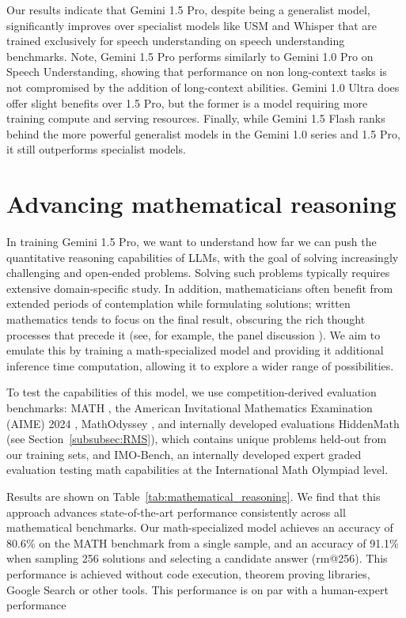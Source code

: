 Our results indicate that Gemini 1.5 Pro, despite being a generalist model, significantly improves over specialist models like USM and Whisper that are trained exclusively for speech understanding on speech understanding benchmarks. Note, Gemini 1.5 Pro performs similarly to Gemini 1.0 Pro on Speech Understanding, showing that performance on non long-context tasks is not compromised by the addition of long-context abilities. Gemini 1.0 Ultra does offer slight benefits over 1.5 Pro, but the former is a model requiring more training compute and serving resources. Finally, while Gemini 1.5 Flash ranks behind the more powerful generalist models in the Gemini 1.0 series and 1.5 Pro, it still outperforms specialist models.

\begin{scriptsize}

\end{scriptsize}

\section{Advancing mathematical reasoning }
\label{sec:mathematical_reasoning}

In training Gemini 1.5 Pro, we want to understand how far we can push the quantitative reasoning capabilities of LLMs, with the goal of solving increasingly challenging and open-ended problems. Solving such problems typically requires extensive domain-specific study. In addition, mathematicians often benefit from extended periods of contemplation while formulating solutions; written mathematics tends to focus on the final result, obscuring the rich thought processes that precede it (see, for example, the panel discussion \citep{MATH-AI-Panel-2023}). We aim to emulate this by training a math-specialized model and providing it additional inference time computation, allowing it to explore a wider range of possibilities.

To test the capabilities of this model, we use competition-derived evaluation benchmarks: MATH \citep{hendrycks2021measuring}, the American Invitational Mathematics Examination (AIME) 2024 \citep{AIME2024}, MathOdyssey \citep{fang2024mathodyssey}, and internally developed evaluations HiddenMath (see Section~\ref{subsubsec:RMS}), which contains unique problems held-out from our training sets, and IMO-Bench, an internally developed expert graded evaluation testing math capabilities at the International Math Olympiad level.

Results are shown on Table~\ref{tab:mathematical_reasoning}. We find that this approach advances state-of-the-art performance consistently across all mathematical benchmarks. Our math-specialized model achieves an accuracy of 80.6\% on the MATH benchmark from a single sample, and an accuracy of 91.1\% when sampling 256 solutions and selecting a candidate answer (rm@256). This performance is achieved without code execution, theorem proving libraries, Google Search or other tools. This performance is on par with a human-expert performance

